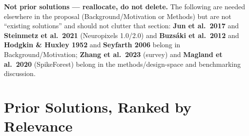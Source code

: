 \documentclass[11pt]{article}
\begin{document}
\noindent\textbf{Not prior solutions --- reallocate, do not delete.} The following are needed elsewhere in the proposal (Background/Motivation or Methods) but are not ``existing solutions'' and should not clutter that section: \textbf{Jun et al.\ 2017} and \textbf{Steinmetz et al.\ 2021} (Neuropixels 1.0/2.0) and \textbf{Buzs\'aki et al.\ 2012} and \textbf{Hodgkin \& Huxley 1952} and \textbf{Seyfarth 2006} belong in Background/Motivation; \textbf{Zhang et al.\ 2023} (survey) and \textbf{Magland et al.\ 2020} (SpikeForest) belong in the methods/design-space and benchmarking discussion.

\section*{Prior Solutions, Ranked by Relevance}
\end{document}
